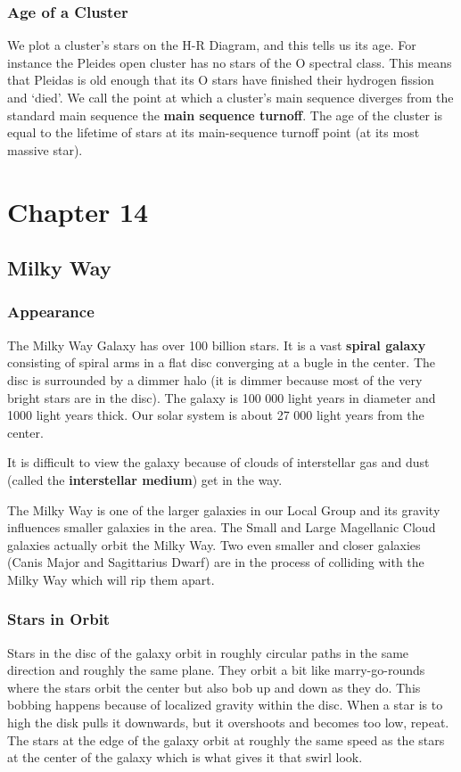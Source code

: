 \documentclass[12pt]{article}
\begin{document}
\subsubsection{Age of a Cluster}
We plot a cluster's stars on the H-R Diagram, and this tells us its age. For instance the Pleides open cluster has no stars of the O spectral class. This means that Pleidas is old enough that its O stars have finished their hydrogen fission and `died'. We call the point at which a cluster's main sequence diverges from the standard main sequence the \textbf{main sequence turnoff}. The age of the cluster is equal to the lifetime of stars at its main-sequence turnoff point (at its most massive star).

\section{Chapter 14}
\subsection{Milky Way}
\subsubsection{Appearance}
The Milky Way Galaxy has over 100 billion stars. It is a vast \textbf{spiral galaxy} consisting of spiral arms in a flat disc converging at a bugle in the center. The disc is surrounded by a dimmer halo (it is dimmer because most of the very bright stars are in the disc). The galaxy is 100 000 light years in diameter and 1000 light years thick. Our solar system is about 27 000 light years from the center.

It is difficult to view the galaxy because of clouds of interstellar gas and dust (called the \textbf{interstellar medium}) get in the way.

The Milky Way is one of the larger galaxies in our Local Group and its gravity influences smaller galaxies in the area. The Small and Large Magellanic Cloud galaxies actually orbit the Milky Way. Two even smaller and closer galaxies (Canis Major and Sagittarius Dwarf) are in the process of colliding with the Milky Way which will rip them apart.

\subsubsection{Stars in Orbit}
Stars in the disc of the galaxy orbit in roughly circular paths in the same direction and roughly the same plane. They orbit a bit like marry-go-rounds where the stars orbit the center but also bob up and down as they do. This bobbing happens because of localized gravity within the disc. When a star is to high the disk pulls it downwards, but it overshoots and becomes too low, repeat. The stars at the edge of the galaxy orbit at roughly the same speed as the stars at the center of the galaxy which is what gives it that swirl look.
\end{document}
